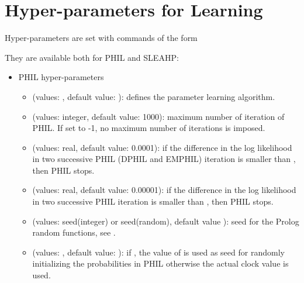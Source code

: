 \documentclass[letterpaper,10pt,english]{sphinxmanual}
\begin{document}
\section{Hyper-parameters for Learning}
\label{\detokenize{index:hyper-parameters-for-learning}}
Hyper-parameters are set with commands of the form

%
\begin{sphinxVerbatim}[commandchars=\\\{\}]
 
\end{sphinxVerbatim}

They are available both for PHIL and SLEAHP:
\begin{itemize}
\item {} 
PHIL hyper-parameters
\begin{itemize}
\item {} 
 (values: , default value: ): defines the parameter learning algorithm.

\item {} 
 (values: integer, default value: 1000): maximum number of iteration of PHIL. If set to -1, no maximum number of iterations is imposed.

\item {} 
 (values: real, default value: 0.0001): if the difference in the log likelihood in two successive PHIL (DPHIL and EMPHIL) iteration is smaller than , then PHIL stops.

\item {} 
 (values: real, default value: 0.00001): if the difference in the log likelihood in two successive PHIL iteration is smaller than , then PHIL stops.

\item {} 
 (values: seed(integer) or seed(random), default value ): seed for the Prolog random functions, see  .

\item {} 
 (values: , default value: ): if , the value of  is used as seed for randomly initializing the probabilities in PHIL  otherwise the actual clock value is used.


\end{itemize}
\end{itemize}
\end{document}
